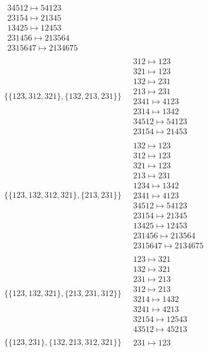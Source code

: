 \begin{scriptsize}
\begin{align}
\begin{matrix}
34512 \mapsto 54123
\\
23154 \mapsto 21345
\\
13425 \mapsto 12453
\\
231456 \mapsto 213564
\\
2315647 \mapsto 2134675
\end{matrix}
\\
\{\{123, 312, 321\}, \{132, 213, 231\}\}
\ 
&
\begin{matrix}
312 \mapsto 123
\\
321 \mapsto 123
\\
132 \mapsto 231
\\
213 \mapsto 231
\\
2341 \mapsto 4123
\\
2314 \mapsto 1342
\\
34512 \mapsto 54123
\\
23154 \mapsto 21453
\end{matrix}
\\
\{\{123, 132, 312, 321\}, \{213, 231\}\}
\ 
&
\begin{matrix}
132 \mapsto 123
\\
312 \mapsto 123
\\
321 \mapsto 123
\\
213 \mapsto 231
\\
1234 \mapsto 1342
\\
2341 \mapsto 4123
\\
34512 \mapsto 54123
\\
23154 \mapsto 21345
\\
13425 \mapsto 12453
\\
231456 \mapsto 213564
\\
2315647 \mapsto 2134675
\end{matrix}
\\
\{\{123, 132, 321\}, \{213, 231, 312\}\}
\ 
&
\begin{matrix}
123 \mapsto 321
\\
132 \mapsto 321
\\
231 \mapsto 213
\\
312 \mapsto 213
\\
3214 \mapsto 1432
\\
3241 \mapsto 4213
\\
32154 \mapsto 12543
\\
43512 \mapsto 45213
\end{matrix}
\\
\{\{123, 231\}, \{132, 213, 312, 321\}\}
\ 
&
\begin{matrix}
231 \mapsto 123

\end{matrix}
\end{align}
\end{scriptsize}
